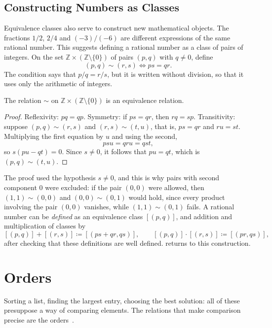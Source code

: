 \subsection{Constructing Numbers as Classes}

Equivalence classes also serve to construct new mathematical objects. The fractions $1/2$, $2/4$ and $(-3)/(-6)$ are different expressions of the same rational number. This suggests defining a rational number as a class of pairs of integers. On the set $\mathbb Z\times(\mathbb Z\setminus\{0\})$ of pairs $(p,q)$ with $q\ne0$, define
\[
(p,q)\sim(r,s)\iff ps=qr .
\]
The condition says that $p/q=r/s$, but it is written without division, so that it uses only the arithmetic of integers.

\begin{proposition}
\label{prop:fractions}
The relation $\sim$ on $\mathbb Z\times(\mathbb Z\setminus\{0\})$ is an equivalence relation.
\end{proposition}

\begin{proof}
Reflexivity: $pq=qp$. Symmetry: if $ps=qr$, then $rq=sp$. Transitivity: suppose $(p,q)\sim(r,s)$ and $(r,s)\sim(t,u)$, that is, $ps=qr$ and $ru=st$. Multiplying the first equation by $u$ and using the second,
\[
psu=qru=qst ,
\]
so $s(pu-qt)=0$. Since $s\ne0$, it follows that $pu=qt$, which is $(p,q)\sim(t,u)$.
\end{proof}

The proof used the hypothesis $s\ne0$, and this is why pairs with second component $0$ were excluded: if the pair $(0,0)$ were allowed, then $(1,1)\sim(0,0)$ and $(0,0)\sim(0,1)$ would hold, since every product involving the pair $(0,0)$ vanishes, while $(1,1)\sim(0,1)$ fails. A rational number can be \emph{defined} as an equivalence class $[(p,q)]$, and addition and multiplication of classes by
\[
[(p,q)]+[(r,s)]\coloneqq[(ps+qr,qs)],\qquad[(p,q)]\cdot[(r,s)]\coloneqq[(pr,qs)],
\]
after checking that these definitions are well defined.  returns to this construction.

\section{Orders}
\label{sec:orders}

Sorting a list, finding the largest entry, choosing the best solution: all of these presuppose a way of comparing elements. The relations that make comparison precise are the orders~\cite{daveypriestley2002}.

